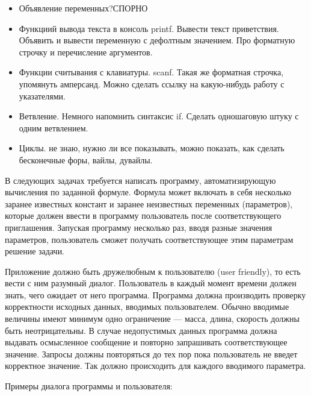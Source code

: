 \begin{itemize}
	\item Объявление переменных?СПОРНО
	\item Функциий вывода текста в консоль printf. Вывести текст приветствия. Объявить и вывести переменную с дефолтным значением. Про форматную строчку и перечисление аргументов.
	\item Функции считывания с клавиатуры. scanf. Такая же форматная строчка, упомянуть амперсанд. Можно сделать ссылку на какую-нибудь работу с указателями.
	\item Ветвление. Немного напомнить синтаксис if. Сделать одношаговую штуку с одним ветвлением. 
	\item Циклы. не знаю, нужно ли все показывать, можно показать, как сделать бесконечные форы, вайлы, дувайлы.
\end{itemize}
В следующих задачах требуется написать программу, автоматизирующую вычисления
по заданной формуле. Формула может включать в себя несколько заранее известных
констант и заранее неизвестных переменных (параметров), которые должен ввести
в программу пользователь после соответствующего приглашения. Запуская
программу несколько раз, вводя разные значения параметров, пользователь сможет
получать соответствующее этим параметрам решение задачи.

Приложение должно быть дружелюбным к пользователю (user friendly), то есть
вести с ним разумный диалог. Пользователь в каждый момент времени должен
знать, чего ожидает от него программа. Программа должна производить проверку
корректности исходных данных, вводимых пользователем.
Обычно вводимые величины имеют минимум одно ограничение --- масса, длина,
скорость должны быть неотрицательны.
В случае недопустимых данных программа должна выдавать осмысленное сообщение
и повторно запрашивать соответствующее значение. Запросы должны повторяться
до тех пор пока пользователь не введет корректное значение. Так должно происходить
для каждого вводимого параметра.

Примеры диалога программы и пользователя:


